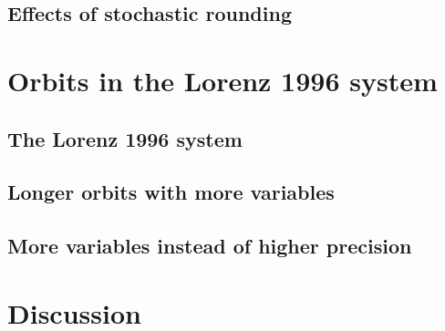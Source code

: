 \subsection{Effects of stochastic rounding}

\section{Orbits in the Lorenz 1996 system}
\subsection{The Lorenz 1996 system}
\subsection{Longer orbits with more variables}
\subsection{More variables instead of higher precision}

\section{Discussion}